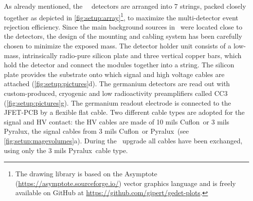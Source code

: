 As already mentioned, the \gerda\ \phasetwo\ detectors are arranged into 7 strings, packed
closely together as depicted in
\cref{fig:setup:array}\footnote{\label{footnote:gedetplots}%
  The  drawing library is based on the Asymptote
  (\url{https://asymptote.sourceforge.io/}) vector graphics language and is freely
  available on GitHub at \url{https://github.com/gipert/gedet-plots}.
}, to maximize the multi-detector event rejection efficiency. Since the main background
sources in \phaseone\ were located close to the detectors, the design of the mounting and
cabling system has been carefully chosen to minimize the exposed mass. The detector holder
unit consists of a low-mass, intrinsically radio-pure silicon plate and three vertical
copper bars, which hold the detector and connect the modules together into a string. The
silicon plate provides the substrate onto which signal and high voltage cables are
attached (\cref{fig:setup:pictures}d). The germanium detectors are read out with
custom-produced, cryogenic and low radioactivity preamplifiers called
CC3~\cite{Riboldi2015} (\cref{fig:setup:pictures}g). The germanium readout electrode is
connected to the JFET-PCB by a flexible flat cable. Two different cable types are adopted
for the signal and HV contact: the HV cables are made of 10 mils Cuflon\reg\ or 3 mils
Pyralux\reg, the signal cables from 3 mils Cuflon\reg\ or Pyralux\reg\ (see
\cref{fig:setup:magevolumes}a). During the \phasetwop\ upgrade all cables have been
exchanged, using only the 3 mils Pyralux\reg\ cable type.

